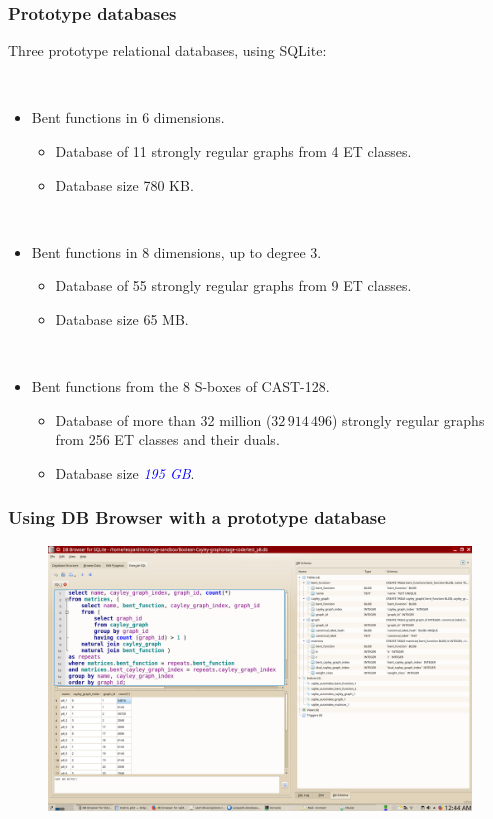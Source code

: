 \documentclass[pdf,sprung,slideColor,nocolorBG]{beamer}
\newenvironment{colortheme}[1]{
\def\ProvidesPackageRCS $##1${\relax}
\renewcommand{\ProcessOptions}{\relax}
\makeatletter

\makeatother
}{}
\newcommand{\Emph}[1]{\emph{\textcolor{blue}{#1}}}
\begin{document}
\begin{colortheme}{jubata}

\begin{frame}
\frametitle{Prototype databases}
Three prototype relational databases, using SQLite:

~

\begin{itemize}
 \item
Bent functions in 6 dimensions.
 \begin{itemize}
  \item
Database of 11 strongly regular graphs from 4 ET classes.
  \item
Database size 780 KB.
 \end{itemize}

~

 \item
Bent functions in 8 dimensions, up to degree 3.
 \begin{itemize}
  \item
Database of 55 strongly regular graphs from 9 ET classes.
  \item
Database size 65 MB.
 \end{itemize}

~

 \item
Bent functions from the 8 S-boxes of CAST-128.
 \begin{itemize}
  \item
Database of more than 32 million ($32\,914\,496$) strongly regular graphs from 256 ET classes and their duals.
  \item
Database size \Emph{195 GB}.
 \end{itemize}
\end{itemize}
\end{frame}

\begin{frame}
\frametitle{Using DB Browser with a prototype database}
\begin{figure}
\centering
\begin{minipage}{\textwidth}
  \centering
\includegraphics[width=1.00\linewidth]{Browser-session-SQLite.png}
  \label{fig:Browser_session_SQLite}
\end{minipage}%
\end{figure}
\end{frame}


\end{colortheme}
\end{document}
